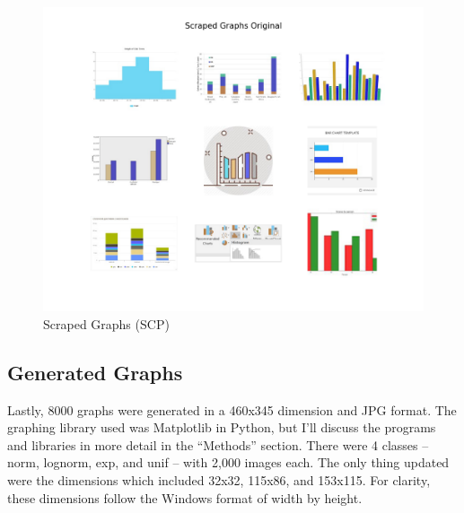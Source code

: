 \documentclass[12pt]{article}
\begin{document}
            \begin{figure}[ht]
            
                \begin{center}

                    \includegraphics[scale=0.6]{scraped_overview_original.png}
                    \caption{Scraped Graphs (SCP) \cite{sunedition2021}}
                    \label{scraped-overview}
        
                \end{center}
                
            \end{figure}

            

        \subsection{Generated Graphs}
        
            Lastly, 8000 graphs were generated in a 460x345 dimension and JPG format. 
            The graphing library used was Matplotlib in Python, 
            but I’ll discuss the programs and libraries in more detail in the “Methods” section. 
            There were 4 classes -- norm, lognorm, exp, and unif -- with 2,000 images each. 
            The only thing updated were the dimensions which included 32x32, 115x86, and 153x115. 
            For clarity, these dimensions follow the Windows format of width by height.
\end{document}
